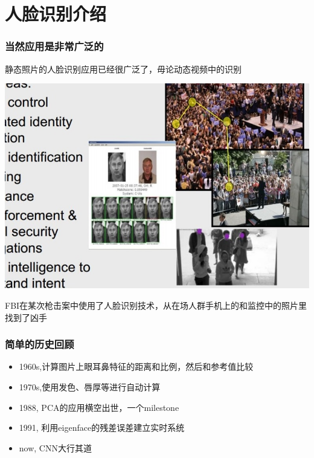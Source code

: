 \documentclass[24pt]{beamer}
\begin{document}
\section{人脸识别介绍}
\begin{frame}
\frametitle{当然应用是非常广泛的}
静态照片的人脸识别应用已经很广泛了，毋论动态视频中的识别\\
\begin{center}
\includegraphics[width=0.6\linewidth]{fig05.jpg}
\end{center}
FBI在某次枪击案中使用了人脸识别技术，从在场人群手机上的和监控中的照片里找到了凶手
\end{frame}
\begin{frame}
\frametitle{简单的历史回顾}
\begin{itemize}
\item 1960s,计算图片上眼耳鼻特征的距离和比例，然后和参考值比较
\item 1970s,使用发色、唇厚等进行自动计算
\item 1988, PCA的应用横空出世，一个milestone
\item 1991, 利用eigenface的残差误差建立实时系统
\item now, CNN大行其道
\end{itemize}
\end{frame}
\end{document}
